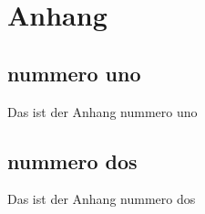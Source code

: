 \section*{Anhang}



\subsection*{nummero uno}
    Das ist der Anhang nummero uno
\subsection*{nummero dos}
    Das ist der Anhang nummero dos